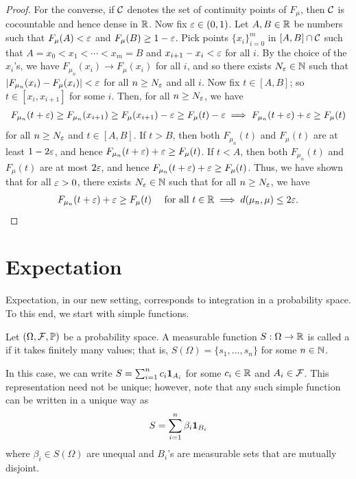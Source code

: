 \begin{proof}
    For the converse, if $\mathcal{C}$ denotes the set of continuity points of $F_{\mu}$, then $\mathcal{C}$ is cocountable and hence dense in $\mathbb{R}$. Now fix $\varepsilon \in (0,1)$. Let $A,B \in \mathbb{R}$ be numbers such that $F_{\mu}(A) < \varepsilon$ and $F_{\mu}(B) \geq 1-\varepsilon$. Pick points $\{x_{i}\}_{i=0}^{m}$ in $[A,B] \cap \mathcal{C}$ such that $A=x_{0} < x_{1} < \cdots < x_{m} = B$ and $x_{i+1}-x_{i} < \varepsilon$ for all $i$. By the choice of the $x_{i}$'s, we have $F_{\mu_{n}}(x_{i}) \to F_{\mu}(x_{i})$ for all $i$, and so there exists $N_{\varepsilon} \in \mathbb{N}$ such that $\left| F_{\mu_{n}}(x_{i}) - F_{\mu}(x_{i}) \right| < \varepsilon$ for all $n \geq N_{\varepsilon}$ and all $i$. Now fix $t \in [A,B]$; so $t \in [x_{i},x_{i+1}]$ for some $i$. Then, for all $n \geq N_{\varepsilon}$, we have
    \begin{align}
        F_{\mu_{n}}(t+\varepsilon) \geq F_{\mu_{n}}(x_{i+1}) \geq F_{\mu}(x_{i+1}) - \varepsilon \geq F_{\mu}(t) - \varepsilon \implies F_{\mu_{n}}(t+\varepsilon) + \varepsilon \geq F_{\mu}(t)
    \end{align}
    for all $n \geq N_{\varepsilon}$ and $t \in [A,B]$. If $t > B$, then both $F_{\mu_{n}}(t)$ and $F_{\mu}(t)$ are at least $1-2\varepsilon$, and hence $F_{\mu_{n}}(t+\varepsilon) + \varepsilon \geq F_{\mu}(t)$. If $t < A$, then both $F_{\mu_{n}}(t)$ and $F_{\mu}(t)$ are at most $2\varepsilon$, and hence $F_{\mu_{n}}(t+\varepsilon) + \varepsilon \geq F_{\mu}(t)$. Thus, we have shown that for all $\varepsilon > 0$, there exists $N_{\varepsilon} \in \mathbb{N}$ such that for all $n \geq N_{\varepsilon}$, we have
    \begin{align}
        F_{\mu_{n}}(t+\varepsilon) + \varepsilon \geq F_{\mu}(t) \quad \text{ for all } t \in \mathbb{R} \implies d(\mu_{n},\mu) \leq 2\varepsilon.
    \end{align}
\end{proof}

\section{Expectation}

Expectation, in our new setting, corresponds to integration in a probability space. To this end, we start with simple functions.

\begin{definition}
    Let $(\Omega, \mathcal{F}, \mathbb{P})$ be a probability space. A measurable function $S: \Omega \to \mathbb{R}$ is called a  if it takes finitely many values; that is, $S(\Omega) = \{s_{1},\ldots,s_{n}\}$ for some $n \in \mathbb{N}$.
\end{definition}
In this case, we can write $S = \sum_{i=1}^{n} c_{i} \textbf{1}_{A_{i}}$ for some $c_{i} \in \mathbb{R}$ and $A_{i} \in \mathcal{F}$. This representation need not be unique; however, note that any such simple function can be written in a unique way as
\begin{align}
    S = \sum_{i=1}^{n} \beta_{i} \textbf{1}_{B_{i}}
\end{align}
where $\beta_{i} \in S(\Omega)$ are unequal and $B_{i}$'s are measurable sets that are mutually disjoint.

